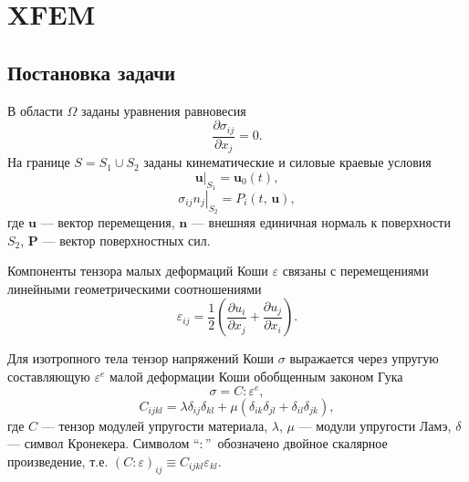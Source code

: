 \chapter{XFEM}
\label{cha:analysis}
\section{Постановка задачи}
В области $\Omega$ заданы уравнения равновесия \cite{Pisarenko1981}
\begin{equation}
\frac{\partial\sigma_{ij}}{\partial x_j} = 0.%
\label{F:F1}
\end{equation}
На границе $S=S_{1}\cup S_{2}$ заданы кинематические и силовые
краевые условия
\begin{equation}
\left.\mathbf{u}\right|_{S_{1}}=\mathbf{u}_{0}\left(t\right),
\label{F:F2}
\end{equation}
\begin{equation}
\left.\sigma_{ij}n_j\right|_{S_{2}}=P_{i}\left(t,\,\mathbf{u}\right),%
\label{F:F3}
\end{equation}
где $\mathbf{u}$ --- вектор перемещения, $\mathbf{n}$ --- внешняя единичная нормаль к поверхности $S_{2}$, $\mathbf{P}$ --- вектор поверхностных сил.

Компоненты тензора малых деформаций Коши $\varepsilon$ связаны с перемещениями линейными геометрическими соотношениями
\begin{equation}
\varepsilon_{ij}=\frac{1}{2} \left(\frac{\partial u_{i}}{\partial x_{j}} + \frac{\partial u_{j}}{\partial x_{i}} \right).
\label{F:F4}
\end{equation}

Для изотропного тела тензор напряжений Коши $\sigma$ выражается через упругую составляющую $\varepsilon^{e}$ малой деформации Коши обобщенным законом Гука
\begin{equation}
\sigma=C:\varepsilon^{e},
\label{F:F_Hook}
\end{equation}
\begin{equation}
C_{ijkl}=\lambda\delta_{ij}\delta_{kl}+\mu\left(\delta_{ik}\delta_{jl}+\delta_{il}\delta_{jk}\right),
\label{F:F5}
\end{equation}
где $C$ --- тензор модулей упругости материала, $\lambda$, $\mu$ --- модули упругости Ламэ, $\delta$ --- символ Кронекера. Символом \textquotedblleft $:$\textquotedblright\ обозначено двойное скалярное произведение, т.е. $\left(C:\varepsilon\right)_{ij}\equiv C_{ijkl}\varepsilon_{kl}$.




